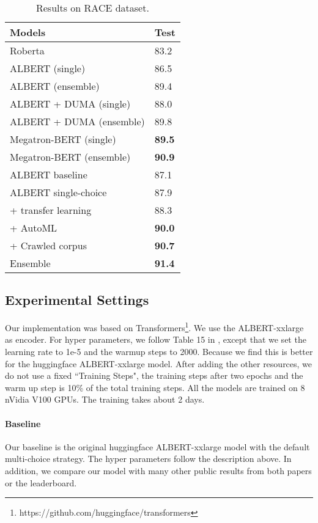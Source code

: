 \documentclass[11pt,a4paper]{article}
\begin{document}
\begin{table}[t]
\small
    \centering
    \begin{tabular}{ll}
    \hline 
        Models & Test \\ \hline
        Roberta \cite{liu2019roberta} &    83.2   \\
        ALBERT (single) \cite{lan2019albert} &    86.5   \\
        ALBERT (ensemble) \cite{lan2019albert} &   89.4   \\
        ALBERT + DUMA (single) \cite{zhu2020duma} &   88.0   \\
        ALBERT + DUMA (ensemble) \cite{zhu2020duma} &  89.8   \\
        Megatron-BERT (single) \cite{shoeybi2019megatron}   &  \bf 89.5   \\
        Megatron-BERT (ensemble) \cite{shoeybi2019megatron}  &  \bf 90.9   \\
        \hline
        ALBERT baseline        & 87.1   \\
        ALBERT single-choice   & 87.9   \\
        + transfer learning   &  88.3   \\
        + AutoML  & \bf 90.0   \\
        + Crawled corpus  & \bf 90.7   \\
        Ensemble & \bf 91.4   \\
        \hline
    \end{tabular}
    \caption{Results on RACE dataset.}
    \label{tab:main-result}
\end{table}

\subsection{Experimental Settings}

Our implementation was based on Transformers\footnote{https://github.com/huggingface/transformers}. We use the ALBERT-xxlarge as encoder. For hyper parameters, we follow Table 15 in \cite{lan2019albert}, except that we set the learning rate to 1e-5 and the warmup steps to 2000. Because we find this is better for the huggingface ALBERT-xxlarge model. After adding the other resources, we do not use a fixed ``Training Steps", the training steps after two epochs and the warm up step is 10\% of the total training steps. All the models are trained on 8 nVidia V100 GPUs. The training takes about 2 days. 


\paragraph{Baseline} Our baseline is the original huggingface ALBERT-xxlarge model with the default multi-choice strategy. The hyper parameters follow the description above. In addition, we compare our model with many other public results from both papers or the leaderboard.
\end{document}
